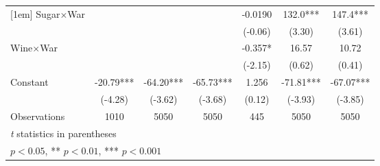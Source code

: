 {\begin{tabular}{l*{6}{c}}
[1em]
Sugar$\times$War&                     &                     &                     &     -0.0190         &       132.0***&       147.4***\\
                    &                     &                     &                     &     (-0.06)         &      (3.30)         &      (3.61)         \\
[1em]
Wine$\times$War&                     &                     &                     &      -0.357*  &       16.57         &       10.72         \\
                    &                     &                     &                     &     (-2.15)         &      (0.62)         &      (0.41)         \\
[1em]
Constant            &      -20.79***&      -64.20***&      -65.73***&       1.256         &      -71.81***&      -67.07***\\
                    &     (-4.28)         &     (-3.62)         &     (-3.68)         &      (0.12)         &     (-3.93)         &     (-3.85)         \\
\hline
Observations        &        1010         &        5050         &        5050         &         445         &        5050         &        5050         \\
\hline\hline
\multicolumn{7}{l}{\footnotesize \textit{t} statistics in parentheses}\\
\multicolumn{7}{l}{\footnotesize * \(p<0.05\), ** \(p<0.01\), *** \(p<0.001\)}\\
\end{tabular}
}
